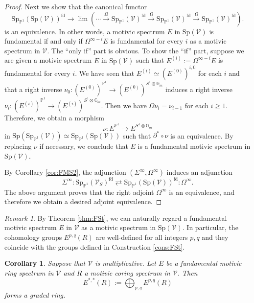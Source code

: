 \documentclass{amsart}
\theoremstyle{plain}
\newtheorem{corollary}[theorem]{Corollary}
\theoremstyle{definition}
\theoremstyle{remark}
\newtheorem{remark}[theorem]{Remark}
\numberwithin{equation}{theorem}
\newcommand{\mbb}[1]{\mathbb{#1}}
\newcommand{\Sp}{\mathrm{Sp}}
\newcommand{\V}{\mathcal{V}}
\newcommand{\fd}{\mathrm{fd}}
\newcommand{\SpP}{\mathrm{Sp}_{\mathbb{P}^1}}
\begin{document}
\begin{proof}
Next we show that the canonical functor
\[
	\SpP(\Sp(\V))^\fd \to \lim(\cdots\xrightarrow{\Omega}\SpP(\V)^\fd\xrightarrow{\Omega}\SpP(\V)^\fd\xrightarrow{\Omega}\SpP(\V)^\fd).
\]
is an equivalence.
In other words, a motivic spectrum $E$ in $\Sp(\V)$ is fundamental if and only if $\Omega^{\infty-i}E$ is fundamental for every $i$ as a motivic spectrum in $\V$.
The ``only if'' part is obvious.
To show the ``if'' part, suppose we are given a motivic spectrum $E$ in $\Sp(\V)$ such that $E^{(i)}:=\Omega^{\infty-i}E$ is fundamental for every $i$.
We have seen that $E^{(i)}\simeq (E^{(0)})^{i,0}$ for each $i$ and that a right inverse $\nu_0\colon(E^{(0)})^{\mbb{P}^1}\to(E^{(0)})^{S^1\otimes\mbb{G}_m}$ induces a right inverse $\nu_i\colon(E^{(i)})^{\mbb{P}^1}\to(E^{(i)})^{S^1\otimes\mbb{G}_m}$.
Then we have $\Omega\nu_i=\nu_{i-1}$ for each $i\ge 1$.
Therefore, we obtain a morphism
\[
	\nu \colon E^{\mbb{P}^1}\to E^{S^1\otimes\mbb{G}_m}
\]
in $\Sp(\SpP(\V))\simeq \SpP(\Sp(\V))$ such that $\partial^*\circ\nu$ is an equivalence.
By replacing $\nu$ if necessary, we conclude that $E$ is a fundamental motivic spectrum in $\Sp(\V)$.

By Corollary \ref{cor:FMS2}, the adjunction $(\Sigma^\infty,\Omega^\infty)$ induces an adjunction
\[
	\Sigma^\infty \colon \SpP(\V_S)^\fd \rightleftarrows \SpP(\Sp(\V))^\fd \colon \Omega^\infty.
\]
The above argument proves that the right adjoint $\Omega^\infty$ is an equivalence, and therefore we obtain a desired adjoint equivalence.
\end{proof}

\begin{remark}
By Theorem \ref{thm:FSt}, we can naturally regard a fundamental motivic spectrum $E$ in $\V$ as a motivic spectrum in $\Sp(\V)$.
In particular, the cohomology groups $E^{p,q}(R)$ are well-defined for all integers $p,q$ and they coincide with the groups defined in Construction \ref{cons:FSt}.
\end{remark}

\begin{corollary}\label{cor:FSt}
Suppose that $\V$ is multiplicative.
Let $E$ be a fundamental motivic ring spectrum in $\V$ and $R$ a motivic coring spectrum in $\V$.
Then
\[
	E^{*,*}(R) := \bigoplus_{p,q}E^{p,q}(R)
\]
forms a graded ring.
\end{corollary}
\end{document}
